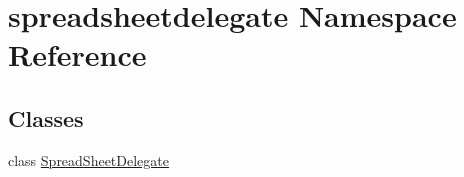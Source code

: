\hypertarget{namespacespreadsheetdelegate}{}\section{spreadsheetdelegate Namespace Reference}
\label{namespacespreadsheetdelegate}
\subsection*{Classes}
\begin{DoxyCompactItemize}
\item 
class \hyperlink{classspreadsheetdelegate_1_1SpreadSheetDelegate}{Spread\+Sheet\+Delegate}
\end{DoxyCompactItemize}
